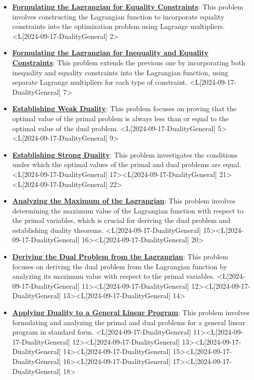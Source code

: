 \documentclass{article}%
\begin{document}
\begin{itemize}[[leftmargin=*]]%
\item \href{https://www.math.purdue.edu/~yipn/421/2024-09-17-DualityGeneral.pdf#page=2}{\textbf{Formulating the Lagrangian for Equality Constraints}}: This problem involves constructing the Lagrangian function to incorporate equality constraints into the optimization problem using Lagrange multipliers. <L[2024-09-17-DualityGeneral] 2>%
\item \href{https://www.math.purdue.edu/~yipn/421/2024-09-17-DualityGeneral.pdf#page=7}{\textbf{Formulating the Lagrangian for Inequality and Equality Constraints}}: This problem extends the previous one by incorporating both inequality and equality constraints into the Lagrangian function, using separate Lagrange multipliers for each type of constraint. <L[2024-09-17-DualityGeneral] 7>%
\item \href{https://www.math.purdue.edu/~yipn/421/2024-09-17-DualityGeneral.pdf#page=5}{\textbf{Establishing Weak Duality}}: This problem focuses on proving that the optimal value of the primal problem is always less than or equal to the optimal value of the dual problem. <L[2024-09-17-DualityGeneral] 5><L[2024-09-17-DualityGeneral] 9>%
\item \href{https://www.math.purdue.edu/~yipn/421/2024-09-17-DualityGeneral.pdf#page=17}{\textbf{Establishing Strong Duality}}: This problem investigates the conditions under which the optimal values of the primal and dual problems are equal. <L[2024-09-17-DualityGeneral] 17><L[2024-09-17-DualityGeneral] 21><L[2024-09-17-DualityGeneral] 22>%
\item \href{https://www.math.purdue.edu/~yipn/421/2024-09-17-DualityGeneral.pdf#page=15}{\textbf{Analyzing the Maximum of the Lagrangian}}: This problem involves determining the maximum value of the Lagrangian function with respect to the primal variables, which is crucial for deriving the dual problem and establishing duality theorems. <L[2024-09-17-DualityGeneral] 15><L[2024-09-17-DualityGeneral] 16><L[2024-09-17-DualityGeneral] 20>%
\item \href{https://www.math.purdue.edu/~yipn/421/2024-09-17-DualityGeneral.pdf#page=11}{\textbf{Deriving the Dual Problem from the Lagrangian}}: This problem focuses on deriving the dual problem from the Lagrangian function by analyzing its maximum value with respect to the primal variables. <L[2024-09-17-DualityGeneral] 11><L[2024-09-17-DualityGeneral] 12><L[2024-09-17-DualityGeneral] 13><L[2024-09-17-DualityGeneral] 14>%
\item \href{https://www.math.purdue.edu/~yipn/421/2024-09-17-DualityGeneral.pdf#page=11}{\textbf{Applying Duality to a General Linear Program}}: This problem involves formulating and analyzing the primal and dual problems for a general linear program in standard form. <L[2024-09-17-DualityGeneral] 11><L[2024-09-17-DualityGeneral] 12><L[2024-09-17-DualityGeneral] 13><L[2024-09-17-DualityGeneral] 14><L[2024-09-17-DualityGeneral] 15><L[2024-09-17-DualityGeneral] 16><L[2024-09-17-DualityGeneral] 17><L[2024-09-17-DualityGeneral] 18>%

\end{itemize}
\end{document}
